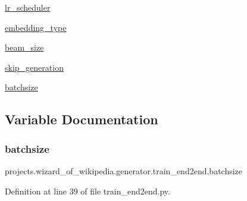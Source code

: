 \begin{DoxyCompactItemize}
\item 
\hyperlink{namespaceprojects_1_1wizard__of__wikipedia_1_1generator_1_1train__end2end_ae100cc5d70b622a5ef7681e87deeb774}{lr\+\_\+scheduler}
\item 
\hyperlink{namespaceprojects_1_1wizard__of__wikipedia_1_1generator_1_1train__end2end_a541edba74b15dc43f7c03219f4602a99}{embedding\+\_\+type}
\item 
\hyperlink{namespaceprojects_1_1wizard__of__wikipedia_1_1generator_1_1train__end2end_a5090eac7597f1f65db30e75276202e55}{beam\+\_\+size}
\item 
\hyperlink{namespaceprojects_1_1wizard__of__wikipedia_1_1generator_1_1train__end2end_a90d2d840bd65cbb3df3197ee614c80f0}{skip\+\_\+generation}
\item 
\hyperlink{namespaceprojects_1_1wizard__of__wikipedia_1_1generator_1_1train__end2end_a48b97dba2d0268456751b3b3874a1367}{batchsize}
\end{DoxyCompactItemize}


\subsection{Variable Documentation}
\mbox{\label{namespaceprojects_1_1wizard__of__wikipedia_1_1generator_1_1train__end2end_a48b97dba2d0268456751b3b3874a1367}} 
\subsubsection{\texorpdfstring{batchsize}{batchsize}}
{\footnotesize\ttfamily projects.\+wizard\+\_\+of\+\_\+wikipedia.\+generator.\+train\+\_\+end2end.\+batchsize}



Definition at line 39 of file train\+\_\+end2end.\+py.

\mbox{\label{namespaceprojects_1_1wizard__of__wikipedia_1_1generator_1_1train__end2end_a5090eac7597f1f65db30e75276202e55}} 
